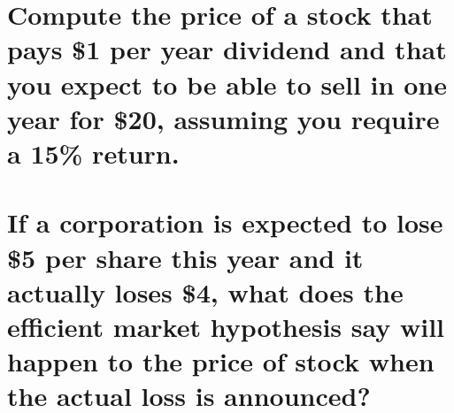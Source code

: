 \documentclass[11pt]{article}
\begin{document}
\section{Compute the price of a stock that pays \$1 per year dividend and that
you expect to be able to sell in one year for \$20, assuming you require a 
15\% return.}

\section{If a corporation is expected to lose \$5 per share this year and it
actually loses \$4, what does the efficient market hypothesis say will happen 
to the price of stock when the actual loss is announced?}
\end{document}
